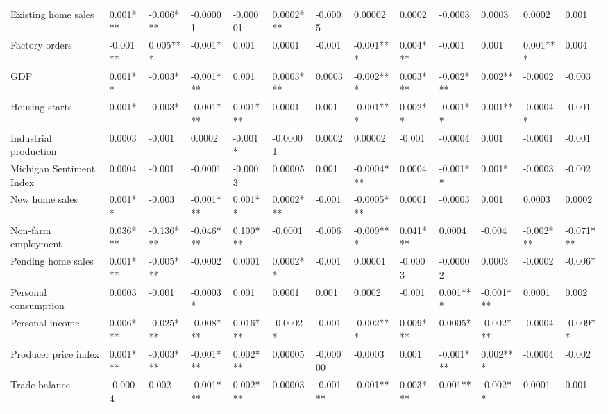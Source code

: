 \begin{landscape}
\begin{table}[]
{\begin{tabular}{lllllllllllll}
Existing home sales      & 0.001***  & -0.006*** & -0.00001   & -0.00001 & 0.0002*** & -0.0005   & 0.00002    & 0.0002   & -0.0003   & 0.0003    & 0.0002    & 0.001     \\
Factory orders           & -0.001**  & 0.005***  & -0.001*    & 0.001    & 0.0001    & -0.001    & -0.001***  & 0.004*** & -0.001    & 0.001     & 0.001***  & 0.004     \\
GDP                      & 0.001**   & -0.003*   & -0.001***  & 0.001    & 0.0003*** & 0.0003    & -0.002***  & 0.003*** & -0.002*** & 0.002**   & -0.0002   & -0.003    \\
Housing starts           & 0.001*    & -0.003*   & -0.001***  & 0.001*** & 0.0001    & 0.001     & -0.001***  & 0.002**  & -0.001**  & 0.001**   & -0.0004*  & -0.001    \\
Industrial production    & 0.0003    & -0.001    & 0.0002     & -0.001*  & -0.00001  & 0.0002    & 0.00002    & -0.001   & -0.0004   & 0.001     & -0.0001   & -0.001    \\
Michigan Sentiment Index & 0.0004    & -0.001    & -0.0001    & -0.0003  & 0.00005   & 0.001     & -0.0004*** & 0.0004   & -0.001**  & 0.001*    & -0.0003   & -0.002    \\
New home sales           & 0.001**   & -0.003    & -0.001***  & 0.001**  & 0.0002*** & -0.001    & -0.0005*** & 0.0001   & -0.0003   & 0.001     & 0.0003    & 0.0002    \\
Non-farm employment      & 0.036***  & -0.136*** & -0.046***  & 0.100*** & -0.0001   & -0.006    & -0.009***  & 0.041*** & 0.0004    & -0.004    & -0.002*** & -0.071*** \\
Pending home sales       & 0.001***  & -0.005*** & -0.0002    & 0.0001   & 0.0002**  & -0.001    & 0.00001    & -0.0003  & -0.00002  & 0.0003    & -0.0002   & -0.006*   \\
Personal consumption     & 0.0003    & -0.001    & -0.0003*   & 0.001    & 0.0001    & 0.001     & 0.0002     & -0.001   & 0.001***  & -0.001*** & 0.0001    & 0.002     \\
Personal income          & 0.006***  & -0.025*** & -0.008***  & 0.016*** & -0.0002*  & -0.001    & -0.002***  & 0.009*** & 0.0005*   & -0.002*** & -0.0004   & -0.009**  \\
Producer price index     & 0.001***  & -0.003*** & -0.001***  & 0.002*** & 0.00005   & -0.00000  & -0.0003    & 0.001    & -0.001*** & 0.002***  & -0.0004   & -0.002    \\
Trade balance            & -0.0004   & 0.002     & -0.001***  & 0.002*** & 0.00003   & -0.001**  & -0.001**   & 0.003*** & 0.001**   & -0.002**  & 0.0001    & 0.001     \\ \hline

\end{tabular}}
\end{table}
\end{landscape}
